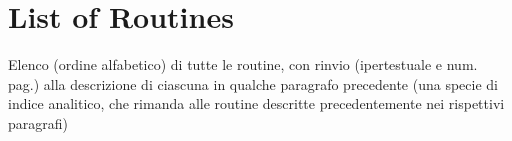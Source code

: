 \section{List of Routines}\label{sec:routines}

   Elenco (ordine alfabetico) di tutte le routine, con rinvio (ipertestuale e num. pag.) alla descrizione
     di ciascuna in qualche paragrafo precedente
     (una specie di indice analitico, che rimanda alle routine descritte precedentemente nei rispettivi paragrafi)


